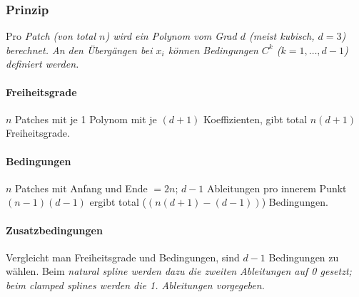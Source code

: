 \subsubsection{Prinzip}
Pro \em Patch \em (von total $n$) wird ein Polynom vom Grad $d$ (meist kubisch, $d=3$) berechnet. An den Übergängen 
bei $x_i$ können Bedingungen $C^k$ ($k=1,\ldots, d-1$) definiert werden.

\paragraph{Freiheitsgrade}
$n$ Patches mit je 1 Polynom mit je $(d+1)$ Koeffizienten, gibt total $n(d+1)$ Freiheitsgrade.

\paragraph{Bedingungen}
$n$ Patches mit Anfang und Ende $=2n$;
$d-1$ Ableitungen pro innerem Punkt $(n-1)(d-1)$ ergibt total ($(n(d+1)-(d-1))$) Bedingungen.

\paragraph{Zusatzbedingungen}

Vergleicht man Freiheitsgrade und Bedingungen, sind $d-1$ Bedingungen zu wählen. Beim \em natural 
spline \em werden dazu die zweiten Ableitungen auf 0 gesetzt; beim \em clamped splines \em werden
die 1. Ableitungen vorgegeben.


